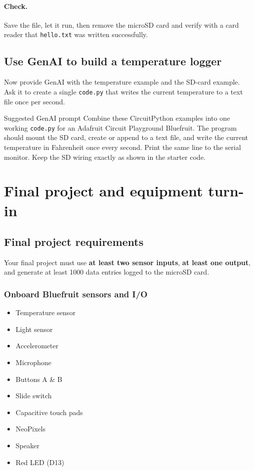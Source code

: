 \documentclass[11pt]{article}
\newcommand{\kit}[1]{\texttt{#1}}
\begin{document}
\paragraph{Check.} Save the file, let it run, then remove the microSD card and verify with a card reader that \kit{hello.txt} was written successfully.

\subsection{Use GenAI to build a temperature logger}
Now provide GenAI with the temperature example and the SD-card example. Ask it to create a single \kit{code.py} that writes the current temperature to a text file once per second.

\begin{calloutbox}{Suggested GenAI prompt}
Combine these CircuitPython examples into one working \kit{code.py} for an Adafruit Circuit Playground Bluefruit. The program should mount the SD card, create or append to a text file, and write the current temperature in Fahrenheit once every second. Print the same line to the serial monitor. Keep the SD wiring exactly as shown in the starter code.
\end{calloutbox}

\section{Final project and equipment turn-in}

\subsection{Final project requirements}
Your final project must use \textbf{at least two sensor inputs}, \textbf{at least one output}, and generate at least 1000 data entries logged to the microSD card.

\subsubsection{Onboard Bluefruit sensors and I/O}
\begin{itemize}
    \item Temperature sensor
    \item Light sensor
    \item Accelerometer
    \item Microphone
    \item Buttons A \& B
    \item Slide switch
    \item Capacitive touch pads
    \item NeoPixels
    \item Speaker
    \item Red LED (D13)
\end{itemize}
\end{document}
